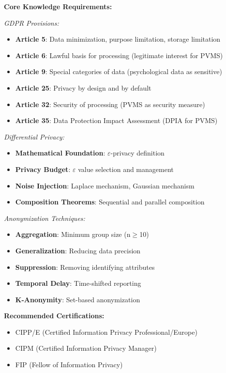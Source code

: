 \documentclass[11pt,a4paper]{article}
\begin{document}
\textbf{Core Knowledge Requirements:}

\textit{GDPR Provisions:}
\begin{itemize}
\item \textbf{Article 5}: Data minimization, purpose limitation, storage limitation
\item \textbf{Article 6}: Lawful basis for processing (legitimate interest for PVMS)
\item \textbf{Article 9}: Special categories of data (psychological data as sensitive)
\item \textbf{Article 25}: Privacy by design and by default
\item \textbf{Article 32}: Security of processing (PVMS as security measure)
\item \textbf{Article 35}: Data Protection Impact Assessment (DPIA for PVMS)
\end{itemize}

\textit{Differential Privacy:}
\begin{itemize}
\item \textbf{Mathematical Foundation}: $\varepsilon$-privacy definition
\item \textbf{Privacy Budget}: $\varepsilon$ value selection and management
\item \textbf{Noise Injection}: Laplace mechanism, Gaussian mechanism
\item \textbf{Composition Theorems}: Sequential and parallel composition
\end{itemize}

\textit{Anonymization Techniques:}
\begin{itemize}
\item \textbf{Aggregation}: Minimum group size (n$\geq$10)
\item \textbf{Generalization}: Reducing data precision
\item \textbf{Suppression}: Removing identifying attributes
\item \textbf{Temporal Delay}: Time-shifted reporting
\item \textbf{K-Anonymity}: Set-based anonymization
\end{itemize}

\textbf{Recommended Certifications:}
\begin{itemize}
\item CIPP/E (Certified Information Privacy Professional/Europe)
\item CIPM (Certified Information Privacy Manager)
\item FIP (Fellow of Information Privacy)
\end{itemize}
\end{document}
